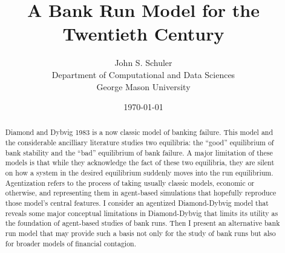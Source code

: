 \documentclass[12pt]{article}
\title{A Bank Run Model for the Twentieth Century}
\author{John S. Schuler \\ Department of Computational and Data Sciences \\ George Mason University}
\date{\today}
\begin{document}

\maketitle
\begin{abstract}
	Diamond and Dybvig 1983 is a now classic model of banking failure. This model and the considerable ancilliary literature studies two equilibria: the ``good'' equilibrium of bank stability and the ``bad'' equilibrium of bank failure. A major limitation of these models is that while they acknowledge the fact of these two equilibria, they are silent on how a system in the desired equilibrium suddenly moves into the run equilibrium. Agentization refers to the process of taking usually classic models, economic or otherwise, and representing them in agent-based simulations that hopefully reproduce those model's central features. I consider an agentized Diamond-Dybvig model that reveals some major conceptual limitations in Diamond-Dybvig that limits its utility as the foundation of agent-based studies of bank runs. Then I present an alternative bank run model that may provide such a basis not only for the study of bank runs but also for broader models of financial contagion.
\end{abstract}
\begin{doublespace}
\end{doublespace}
\end{document}
